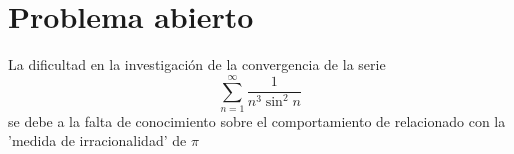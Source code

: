 \documentclass{article}
\begin{document}
\section{Problema abierto}
La dificultad en la investigación de la convergencia
de la serie $$\sum_{n=1}^\infty\frac{1}{n^3\sin^2n}$$
se debe a la falta de conocimiento sobre el comportamiento de
relacionado con la 'medida de irracionalidad' de $\pi$
\end{document}
